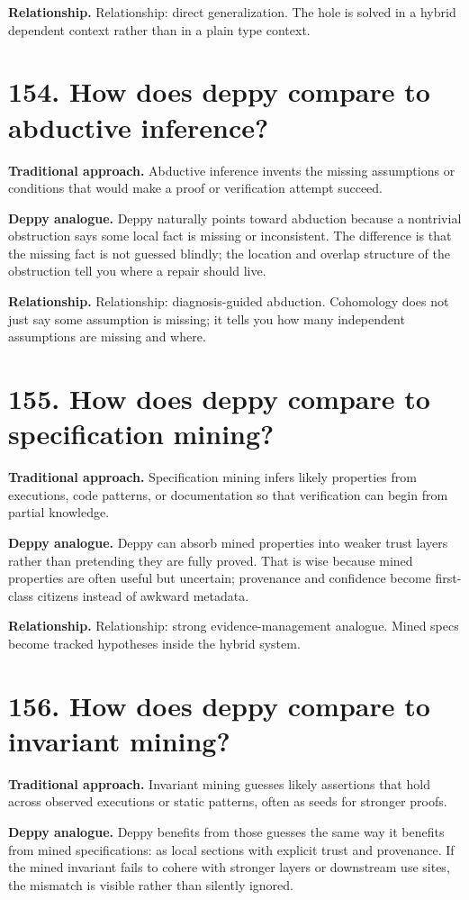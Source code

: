 \documentclass[11pt,openany]{book}
\begin{document}
\textbf{Relationship.} Relationship: direct generalization. The hole is solved in a hybrid dependent context rather than in a plain type context.

\section*{154. How does deppy compare to abductive inference?}
\textbf{Traditional approach.} Abductive inference invents the missing assumptions or conditions that would make a proof or verification attempt succeed.

\textbf{Deppy analogue.} Deppy naturally points toward abduction because a nontrivial obstruction says some local fact is missing or inconsistent. The difference is that the missing fact is not guessed blindly; the location and overlap structure of the obstruction tell you where a repair should live.

\textbf{Relationship.} Relationship: diagnosis-guided abduction. Cohomology does not just say some assumption is missing; it tells you how many independent assumptions are missing and where.

\section*{155. How does deppy compare to specification mining?}
\textbf{Traditional approach.} Specification mining infers likely properties from executions, code patterns, or documentation so that verification can begin from partial knowledge.

\textbf{Deppy analogue.} Deppy can absorb mined properties into weaker trust layers rather than pretending they are fully proved. That is wise because mined properties are often useful but uncertain; provenance and confidence become first-class citizens instead of awkward metadata.

\textbf{Relationship.} Relationship: strong evidence-management analogue. Mined specs become tracked hypotheses inside the hybrid system.

\section*{156. How does deppy compare to invariant mining?}
\textbf{Traditional approach.} Invariant mining guesses likely assertions that hold across observed executions or static patterns, often as seeds for stronger proofs.

\textbf{Deppy analogue.} Deppy benefits from those guesses the same way it benefits from mined specifications: as local sections with explicit trust and provenance. If the mined invariant fails to cohere with stronger layers or downstream use sites, the mismatch is visible rather than silently ignored.
\end{document}
